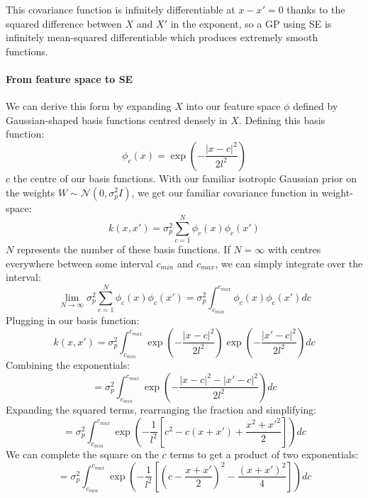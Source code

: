This covariance function is infinitely differentiable at $x - x' = 0$ thanks to the squared difference between $X$ and $X'$ in the exponent, so a GP using SE is infinitely mean-squared differentiable which produces extremely smooth functions.  

\paragraph{From feature space to SE}
We can derive this form by expanding $X$ into our feature space $\phi$ defined by Gaussian-shaped basis functions centred densely in $X$. Defining this basis function:
\begin{equation*}
    \phi_c(x) = \exp \left(- \frac{|x - c|^2}{2l^2} \right)
\end{equation*}
$c$ the centre of our basis functions. With our familiar isotropic Gaussian prior on the weights $W \sim \mathcal{N}(0, \sigma^2_pI)$, we get our familiar covariance function in weight-space:
\begin{equation*}
    k(x, x') = \sigma_p^2 \sum_{c=1}^N \phi_c(x) \phi_c(x') 
\end{equation*}
$N$ represents the number of these basis functions. If $N = \infty$ with centres everywhere between some interval $c_{min}$ and $c_{max}$, we can simply integrate over the interval:
\begin{equation*}
    \lim_{N \to \infty} \sigma_p^2 \sum_{c=1}^N \phi_c(x) \phi_c(x') = \sigma_p^2 \int_{c_{min}}^{c_{max}} \phi_c(x) \phi_c(x') dc
\end{equation*}
Plugging in our basis function:
\begin{equation*}
    k(x, x') = \sigma_p^2 \int_{c_{min}}^{c_{max}} \exp \left(- \frac{|x - c|^2}{2l^2} \right) \exp \left(- \frac{|x' - c|^2}{2l^2} \right) dc
\end{equation*}
Combining the exponentials:
\begin{equation*}
    = \sigma_p^2 \int_{c_{min}}^{c_{max}} \exp \left(- \frac{|x - c|^2 - |x' - c|^2}{2l^2} \right) dc
\end{equation*}
Expanding the squared terms, rearranging the fraction and simplifying:
\begin{equation*}
    = \sigma_p^2 \int_{c_{min}}^{c_{max}} \exp \left( -\frac{1}{l^2} \left[ c^2 - c(x + x') + \frac{x^2 + x'^2}{2} \right] \right) dc
\end{equation*}
We can complete the square on the $c$ terms to get a product of two exponentials:
\begin{equation*}
    = \sigma_p^2 \int_{c_{min}}^{c_{max}} \exp \left( -\frac{1}{l^2} \left[ (c - \frac{x + x'}{2})^2 - \frac{(x + x')^2}{4} \right] \right) dc
\end{equation*}
